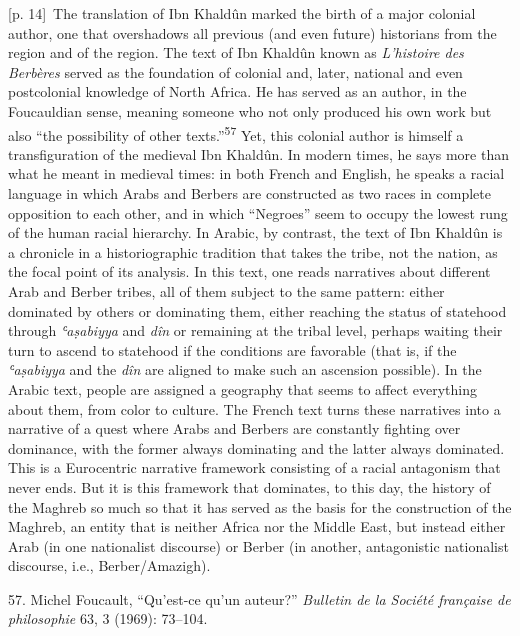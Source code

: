 \documentclass[10pt,a4paper]{article}
\begin{document}
{\scriptsize\color{gray} [p. 14]}\ The translation of Ibn Khaldûn marked the birth of a major colonial author, one that overshadows all previous (and even future) historians from the region and of the region. The text of Ibn Khaldûn known as \textit{L’histoire des Berbères} served as the foundation of colonial and, later, national and even postcolonial knowledge of North Africa. He has served as an author, in the Foucauldian sense, meaning someone who not only produced his own work but also “the possibility of other texts.”\nobreak\textsuperscript{57} Yet, this colonial author is himself a transfiguration of the medieval Ibn Khaldûn. In modern times, he says more than what he meant in medieval times: in both French and English, he speaks a racial language in which Arabs and Berbers are constructed as two races in complete opposition to each other, and in which “Negroes” seem to occupy the lowest rung of the human racial hierarchy. In Arabic, by contrast, the text of Ibn Khaldûn is a chronicle in a historiographic tradition that takes the tribe, not the nation, as the focal point of its analysis. In this text, one reads narratives about different Arab and Berber tribes, all of them subject to the same pattern: either dominated by others or dominating them, either reaching the status of statehood through \textit{ʿaṣabiyya} and \textit{dîn} or remaining at the tribal level, perhaps waiting their turn to ascend to statehood if the conditions are favorable (that is, if the \textit{ʿaṣabiyya} and the \textit{dîn} are aligned to make such an ascension possible). In the Arabic text, people are assigned a geography that seems to affect everything about them, from color to culture. The French text turns these narratives into a narrative of a quest where Arabs and Berbers are constantly fighting over dominance, with the former always dominating and the latter always dominated. This is a Eurocentric narrative framework consisting of a racial antagonism that never ends. But it is this framework that dominates, to this day, the history of the Maghreb so much so that it has served as the basis for the construction of the Maghreb, an entity that is neither Africa nor the Middle East, but instead either Arab (in one nationalist discourse) or Berber (in another, antagonistic nationalist discourse, i.e., Berber/Amazigh).\par{\small 57. Michel Foucault, “Qu’est-ce qu’un auteur?” \textit{Bulletin de la Société française de philosophie} 63, 3 (1969): 73–104.\par}
\end{document}
